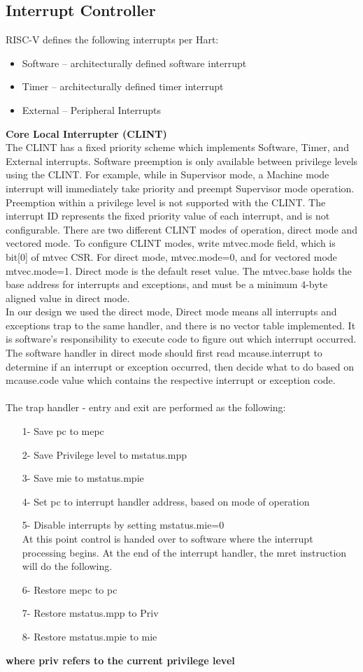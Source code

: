 \documentclass[../main.tex]{subfiles}
\begin{document}
\subsection{Interrupt Controller}
RISC-V defines the following interrupts per Hart:
\begin{itemize}
    \item Software – architecturally defined software interrupt
    \item Timer – architecturally defined timer interrupt
    \item External – Peripheral Interrupts
\end{itemize}
\textbf{Core Local Interrupter (CLINT)}\\
The CLINT has a fixed priority scheme which implements Software, Timer, and External interrupts. Software preemption is only available between privilege levels using the CLINT. For example, while in Supervisor mode, a Machine mode interrupt will immediately take priority and preempt Supervisor mode operation. Preemption within a privilege level is not supported with the CLINT. The interrupt ID represents the fixed priority value of each interrupt, and is not configurable. There are two different CLINT modes of operation, direct mode and vectored mode. To configure CLINT modes, write mtvec.mode field, which is bit[0] of mtvec CSR. For direct mode, mtvec.mode=0, and for vectored mode mtvec.mode=1. Direct mode is the default reset value. The mtvec.base holds the base address for interrupts and exceptions, and must be a minimum 4-byte aligned value in direct mode.\\
In our design we used the direct mode, Direct mode means all interrupts and exceptions trap to the same handler, and there is no vector table implemented. It is software’s responsibility to execute code to figure out which interrupt occurred. The software handler in direct mode should first read mcause.interrupt to determine if an interrupt or exception occurred, then decide what to do based on mcause.code value which contains the respective interrupt or exception code.\\
\\The trap handler - entry and exit are performed as the following:
\begin{itemize}
    \item[1-]Save pc to mepc
    \item[2-]Save Privilege level to mstatus.mpp
    \item[3-]Save mie to mstatus.mpie
    \item[4-]Set pc to interrupt handler address, based on mode of operation
    \item[5-]Disable interrupts by setting mstatus.mie=0\\
    At this point control is handed over to software where the interrupt processing begins. At the end of the interrupt handler, the mret instruction will do the following.
    \item[6-]Restore mepc to pc
    \item[7-]Restore mstatus.mpp to Priv
    \item[8-]Restore mstatus.mpie to mie
\end{itemize}
\textbf{where priv refers to the current privilege level}
\end{document}
